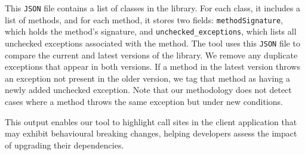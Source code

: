 This \texttt{JSON} file contains a list of classes in the library. For each class, it includes a list of methods, and for each method, it stores two fields: \texttt{methodSignature}, which holds the method’s signature, and \texttt{unchecked\_exceptions}, which lists all unchecked exceptions associated with the method. The tool uses this \texttt{JSON} file to compare the current and latest versions of the library. We remove any duplicate exceptions that appear in both versions. If a method in the latest version throws an exception not present in the older version, we tag that method as having a newly added unchecked exception. Note that our methodology does not detect cases where a method throws the same exception but under new conditions.


This output enables our tool to highlight call sites in the client application that may exhibit behavioural breaking changes, helping developers assess the impact of upgrading their dependencies.
